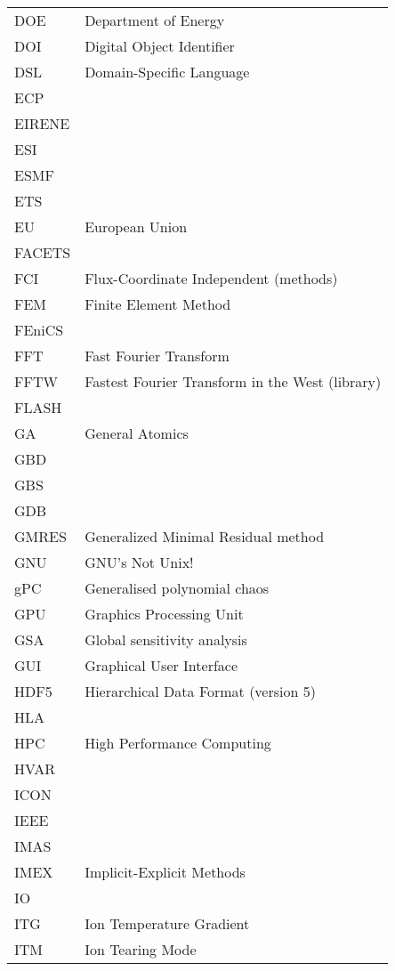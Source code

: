\begin{longtable}{|p{4.0cm}|p{12.0cm}|}
DOE & Department of Energy \\
DOI & Digital Object Identifier \\
DSL & Domain-Specific Language \\
ECP & \\
EIRENE & \\
ESI & \\
ESMF & \\
ETS & \\
EU & European Union \\
FACETS & \\
FCI & Flux-Coordinate Independent (methods) \\
FEM & Finite Element Method \\
FEniCS & \\
FFT & Fast Fourier Transform \\
FFTW & Fastest Fourier Transform in the West (library) \\
FLASH & \\
GA & General Atomics \\
GBD & \\
GBS & \\
GDB & \\
GMRES & Generalized Minimal Residual method \\
GNU & GNU's Not Unix! \\
gPC & Generalised polynomial chaos \\
GPU & Graphics Processing Unit \\
GSA & Global sensitivity analysis \\
GUI & Graphical User Interface \\
HDF5 & Hierarchical Data Format (version 5) \\
HLA & \\
HPC & High Performance Computing \\
HVAR & \\
ICON & \\
IEEE & \\
IMAS & \\
IMEX & Implicit-Explicit Methods \\
IO & \\
ITG & Ion Temperature Gradient \\
ITM & Ion Tearing Mode \\

\end{longtable}

